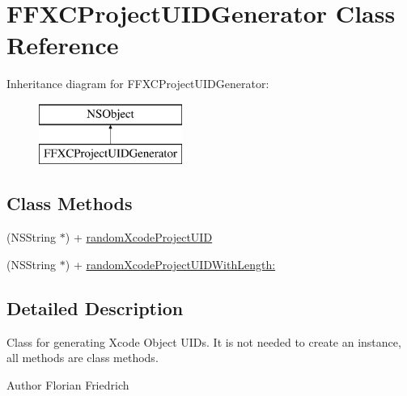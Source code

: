 \hypertarget{interface_f_f_x_c_project_u_i_d_generator}{\section{F\-F\-X\-C\-Project\-U\-I\-D\-Generator Class Reference}
\label{interface_f_f_x_c_project_u_i_d_generator}
}
Inheritance diagram for F\-F\-X\-C\-Project\-U\-I\-D\-Generator\-:\begin{figure}[H]
\begin{center}
\leavevmode
\includegraphics[height=2.000000cm]{interface_f_f_x_c_project_u_i_d_generator}
\end{center}
\end{figure}
\subsection*{Class Methods}
\begin{DoxyCompactItemize}
\item 
(N\-S\-String $\ast$) + \hyperlink{interface_f_f_x_c_project_u_i_d_generator_a374c94382af7feb4d7cf778341863cb1}{random\-Xcode\-Project\-U\-I\-D}
\item 
(N\-S\-String $\ast$) + \hyperlink{interface_f_f_x_c_project_u_i_d_generator_ae55c0a8d2cd327967366e9b040cd1e64}{random\-Xcode\-Project\-U\-I\-D\-With\-Length\-:}
\end{DoxyCompactItemize}


\subsection{Detailed Description}
Class for generating Xcode Object U\-I\-Ds. It is not needed to create an instance, all methods are class methods. \begin{DoxyAuthor}{Author}
Florian Friedrich 
\end{DoxyAuthor}


